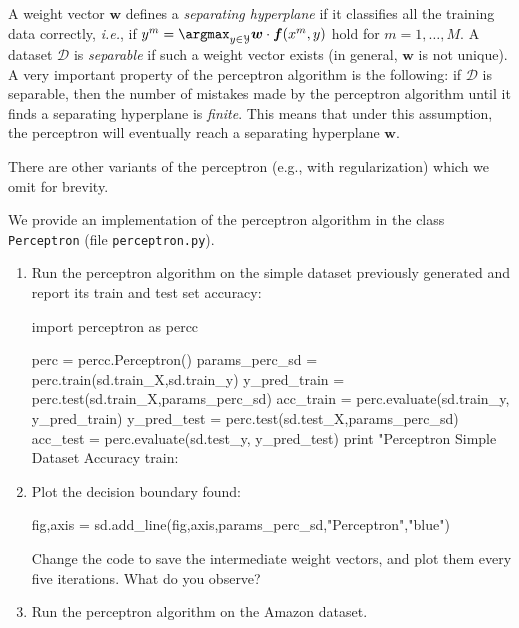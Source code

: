 A weight vector $\boldsymbol{w}$ defines a \emph{separating hyperplane} if it classifies 
all the training data correctly, \emph{i.e.}, if $y^m = \argmax_{y \in \mathcal{Y}} \boldsymbol{w} \cdot \boldsymbol{f}(x^m,y)$ 
hold for $m = 1,\ldots,M$. A dataset $\mathcal{D}$ is \emph{separable} 
if such a weight vector exists (in general, $\boldsymbol{w}$ is not unique). 
A very important property of the perceptron algorithm is the following: 
if $\mathcal{D}$ is separable, then the 
number of mistakes made by the perceptron algorithm until it finds a separating hyperplane is \emph{finite}.  
This means that under this assumption, the perceptron will eventually reach a separating hyperplane $\boldsymbol{w}$. 


There are other variants of the perceptron (e.g., with regularization) which we omit for brevity. 

\begin{exercise}
We provide an implementation of the perceptron algorithm in the class {\tt Perceptron} 
(file {\tt perceptron.py}).  
\begin{enumerate}
\item Run the perceptron algorithm on the simple dataset
previously generated and report its train and test set accuracy: 
\begin{python}
import perceptron as percc

perc = percc.Perceptron()
params_perc_sd = perc.train(sd.train_X,sd.train_y)
y_pred_train = perc.test(sd.train_X,params_perc_sd)
acc_train = perc.evaluate(sd.train_y, y_pred_train)
y_pred_test = perc.test(sd.test_X,params_perc_sd)
acc_test = perc.evaluate(sd.test_y, y_pred_test)
print "Perceptron Simple Dataset Accuracy train: %
\end{python}

\item Plot the decision boundary found:
\begin{python}
fig,axis = sd.add_line(fig,axis,params_perc_sd,"Perceptron","blue")
\end{python}
Change the code to save the intermediate weight vectors,
and plot them every five iterations. What do you observe?

\item Run the perceptron algorithm on the Amazon dataset. 
\end{enumerate}
\end{exercise}

